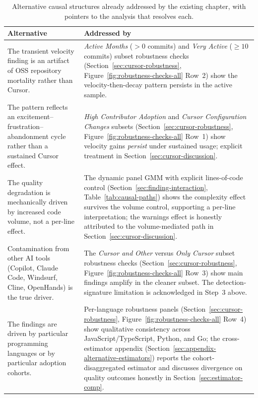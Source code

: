\begin{table}
\centering
\footnotesize
\caption{Alternative causal structures already addressed by the existing chapter, with pointers to the analysis that resolves each.}
\label{tab:cursor-alternatives-pointers}
\begin{tabular}{p{6.5cm}p{8.3cm}}
\toprule
\textbf{Alternative} & \textbf{Addressed by} \\
\midrule
The transient velocity finding is an artifact of OSS repository mortality rather than Cursor. &
\emph{Active Months} ($>0$ commits) and \emph{Very Active} ($\geq 10$ commits) subset robustness checks (Section~\ref{sec:cursor-robustness}, Figure~\ref{fig:robustness-checks-all} Row~2) show the velocity-then-decay pattern persists in the active sample. \\
\addlinespace
The pattern reflects an excitement--frustration--abandonment cycle rather than a sustained Cursor effect. &
\emph{High Contributor Adoption} and \emph{Cursor Configuration Changes} subsets (Section~\ref{sec:cursor-robustness}, Figure~\ref{fig:robustness-checks-all} Row~1) show velocity gains \emph{persist} under sustained usage; explicit treatment in Section~\ref{sec:cursor-discussion}. \\
\addlinespace
The quality degradation is mechanically driven by increased code volume, not a per-line effect. &
The dynamic panel GMM with explicit lines-of-code control (Section~\ref{sec:finding-interaction}, Table~\ref{tab:causal-paths}) shows the complexity effect survives the volume control, supporting a per-line interpretation; the warnings effect is honestly attributed to the volume-mediated path in Section~\ref{sec:cursor-discussion}. \\
\addlinespace
Contamination from other AI tools (Copilot, Claude Code, Windsurf, Cline, OpenHands) is the true driver. &
The \emph{Cursor and Other} versus \emph{Only Cursor} subset robustness checks (Section~\ref{sec:cursor-robustness}, Figure~\ref{fig:robustness-checks-all} Row~3) show main findings amplify in the cleaner subset. The detection-signature limitation is acknowledged in Step~3 above. \\
\addlinespace
The findings are driven by particular programming languages or by particular adoption cohorts. &
Per-language robustness panels (Section~\ref{sec:cursor-robustness}, Figure~\ref{fig:robustness-checks-all} Row~4) show qualitative consistency across JavaScript/TypeScript, Python, and Go; the cross-estimator appendix (Section~\ref{sec:appendix-alternative-estimators}) reports the cohort-disaggregated \citet{callaway2021difference} estimator and discusses divergence on quality outcomes honestly in Section~\ref{sec:estimator-comp}. \\
\bottomrule
\end{tabular}
\end{table}

